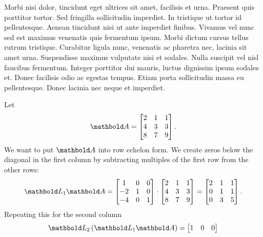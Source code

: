 \begin{example}

Morbi nisi dolor, tincidunt eget ultrices sit amet, facilisis et urna. Praesent quis porttitor tortor. Sed fringilla sollicitudin imperdiet. In tristique ut tortor id pellentesque. Aenean tincidunt nisi ut ante imperdiet finibus. Vivamus vel nunc sed est maximus venenatis quis fermentum ipsum. Morbi dictum cursus tellus rutrum tristique. Curabitur ligula nunc, venenatis ac pharetra nec, lacinia sit amet urna. Suspendisse maximus vulputate nisi et sodales. Nulla suscipit vel nisl faucibus fermentum. Integer porttitor dui mauris, luctus dignissim ipsum sodales et. Donec facilisis odio ac egestas tempus. Etiam porta sollicitudin massa eu pellentesque. Donec lacinia nec neque et imperdiet.

    Let
    \[
        \mat{A} =
        \begin{bmatrix}
            2	&	1	&	1	\\
            4	&	3	&	3	\\
            8	&	7	&	9	\\
        \end{bmatrix}.
    \]
    We want to put $\mat{A}$ into row echelon form. 
    We create zeros below the diagonal in the first column by subtracting multiples of the first row from the other rows:
    \[
        \mat{L}_1 \mat{A} =
        \begin{bmatrix}
            1		&	0	&	0	\\
            -2	&	1	&	0	\\
            -4	&	0	&	1	\\
        \end{bmatrix}
        \cdot
        \begin{bmatrix}
            2	&	1	&	1	\\
            4	&	3	&	3	\\
            8	&	7	&	9	\\
        \end{bmatrix}
        =
        \begin{bmatrix}
            2	&	1	&	1	\\
            0	&	1	&	1	\\
            0	&	3	&	5	\\
        \end{bmatrix}.
    \]
    Repeating this for the second column
    \[
        \mat{L}_2\left(\mat{L}_1 \mat{A}\right) =
        \begin{bmatrix}
            1	&	0		&	0	\\

\end{bmatrix}\]
\end{example}
